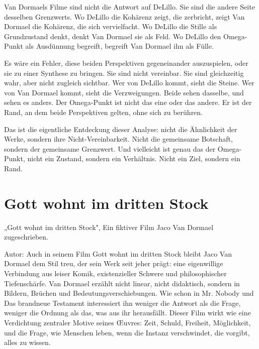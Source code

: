 \documentclass[
  ngerman,
]{article}
\begin{document}
Van Dormaels Filme sind nicht die Antwort auf DeLillo. Sie sind die
andere Seite desselben Grenzwerts. Wo DeLillo die Kohärenz zeigt, die
zerbricht, zeigt Van Dormael die Kohärenz, die sich vervielfacht. Wo
DeLillo die Stille als Grundzustand denkt, denkt Van Dormael sie als
Feld. Wo DeLillo den Omega-Punkt als Ausdünnung begreift, begreift Van
Dormael ihn als Fülle.

Es wäre ein Fehler, diese beiden Perspektiven gegeneinander
auszuspielen, oder sie zu einer Synthese zu bringen. Sie sind nicht
vereinbar. Sie sind gleichzeitig wahr, aber nicht zugleich sichtbar. Wer
von DeLillo kommt, sieht die Steine. Wer von Van Dormael kommt, sieht
die Verzweigungen. Beide sehen dasselbe, und sehen es anders. Der
Omega-Punkt ist nicht das eine oder das andere. Er ist der Rand, an dem
beide Perspektiven gelten, ohne sich zu berühren.

Das ist die eigentliche Entdeckung dieser Analyse: nicht die Ähnlichkeit
der Werke, sondern ihre Nicht-Vereinbarkeit. Nicht die gemeinsame
Botschaft, sondern der gemeinsame Grenzwert. Und vielleicht ist genau
das der Omega-Punkt, nicht ein Zustand, sondern ein Verhältnis. Nicht
ein Ziel, sondern ein Rand.

\section{Gott wohnt im dritten Stock}\label{gott-wohnt-im-dritten-stock}

„Gott wohnt im dritten Stock", Ein fiktiver Film Jaco Van Dormael
zugeschrieben.

Autor: Auch in seinem Film Gott wohnt im dritten Stock bleibt Jaco Van
Dormael dem Stil treu, der sein Werk seit jeher prägt: eine eigenwillige
Verbindung aus leiser Komik, existenzieller Schwere und philosophischer
Tiefenschärfe. Van Dormael erzählt nicht linear, nicht didaktisch,
sondern in Bildern, Brüchen und Bedeutungsverschiebungen. Wie schon in
Mr. Nobody und Das brandneue Testament interessiert ihn weniger die
Antwort als die Frage, weniger die Ordnung als das, was aus ihr
herausfällt. Dieser Film wirkt wie eine Verdichtung zentraler Motive
seines Œuvres: Zeit, Schuld, Freiheit, Möglichkeit, und die Frage, wie
Menschen leben, wenn die Instanz verschwindet, die vorgibt, alles zu
wissen.
\end{document}
